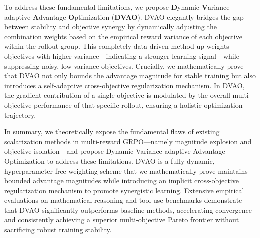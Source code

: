To address these fundamental limitations, we propose \textbf{D}ynamic \textbf{V}ariance-adaptive \textbf{A}dvantage \textbf{O}ptimization (\textbf{DVAO}). DVAO elegantly bridges the gap between stability and objective synergy by dynamically adjusting the combination weights based on the empirical reward variance of each objective within the rollout group. This completely data-driven method up-weights objectives with higher variance—indicating a stronger learning signal—while suppressing noisy, low-variance objectives. Crucially, we mathematically prove that DVAO not only bounds the advantage magnitude for stable training but also introduces a self-adaptive cross-objective regularization mechanism. In DVAO, the gradient contribution of a single objective is modulated by the overall multi-objective performance of that specific rollout, ensuring a holistic optimization trajectory.


In summary, we theoretically expose the fundamental flaws of existing scalarization methods in multi-reward GRPO—namely magnitude explosion and objective isolation—and propose Dynamic Variance-adaptive Advantage Optimization to address these limitations. DVAO is a fully dynamic, hyperparameter-free weighting scheme that we mathematically prove maintains bounded advantage magnitudes while introducing an implicit cross-objective regularization mechanism to promote synergistic learning. Extensive empirical evaluations on mathematical reasoning and tool-use benchmarks demonstrate that DVAO significantly outperforms baseline methods, accelerating convergence and consistently achieving a superior multi-objective Pareto frontier without sacrificing robust training stability.
